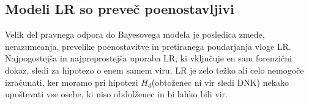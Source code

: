 \documentclass[a4paper,12pt]{article}
\begin{document}
\subsection{Modeli LR so preveč poenostavljivi}
Velik del pravnega odpora do Bayesovega modela je posledica zmede, nerazumeanja, prevelike poenostavitve in pretiranega poudarjanja vloge LR. 
Najpogostejša in najpreprostejša uporaba LR, ki vključuje en sam forenzični dokaz, sledi za hipotezo o enem samem viru. LR je zelo težko ali celo 
nemogoče izračunati, ker moramo pri hipotezi $H_{d}$(obtoženec ni vir sledi DNK) nekako upoštevati vse osebe, ki niso obdolženec in bi lahko bili vir. 
\end{document}
